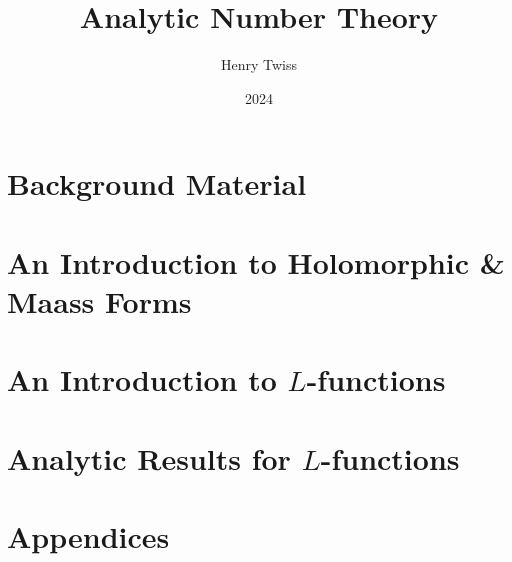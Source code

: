 \documentclass[12pt,oneside]{book}
\title{Analytic Number Theory}
\author{Henry Twiss}
\date{2024}
\begin{document}
\maketitle
\pagestyle{empty}
\tableofcontents
\setcounter{page}{0}
\pagestyle{fancy}

\part{Background Material}
  

\part{An Introduction to Holomorphic \& Maass Forms}
  
  
  
  

\part{An Introduction to \texorpdfstring{$L$}{L}-functions}
  
  

\part{Analytic Results for \texorpdfstring{$L$}{L}-functions}
  
  
  
  


\part{Appendices}
  

\printindex


\end{document}
